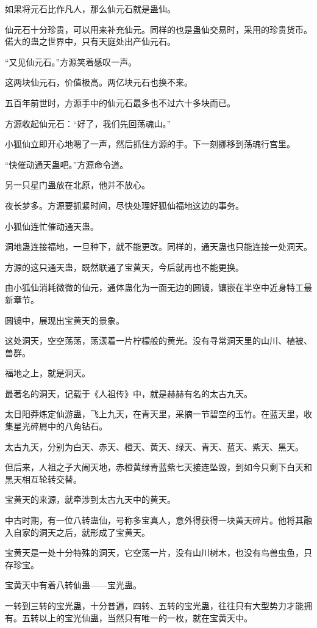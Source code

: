 \begin{this_body}
如果将元石比作凡人，那么仙元石就是蛊仙。

仙元石十分珍贵，可以用来补充仙元。同样的也是蛊仙交易时，采用的珍贵货币。偌大的蛊之世界中，只有天庭处出产仙元石。

“又见仙元石。”方源笑着感叹一声。

这两块仙元石，价值极高。两亿块元石也换不来。

五百年前世时，方源手中的仙元石最多也不过六十多块而已。

方源收起仙元石：“好了，我们先回荡魂山。”

小狐仙立即开心地嗯了一声，然后抓住方源的手。下一刻挪移到荡魂行宫里。

“快催动通天蛊吧。”方源命令道。

另一只星门蛊放在北原，他并不放心。

夜长梦多。方源要抓紧时间，尽快处理好狐仙福地这边的事务。

小狐仙连忙催动通天蛊。

洞地蛊连接福地，一旦种下，就不能更改。同样的，通天蛊也只能连接一处洞天。

方源的这只通天蛊，既然联通了宝黄天，今后就再也不能更换。

由小狐仙消耗微微的仙元，通体蛊化为一面无边的圆镜，镶嵌在半空中近身特工最新章节。

圆镜中，展现出宝黄天的景象。

这处洞天，空空荡荡，荡漾着一片柠檬般的黄光。没有寻常洞天里的山川、植被、兽群。

福地之上，就是洞天。

最著名的洞天，记载于《人祖传》中，就是赫赫有名的太古九天。

太日阳莽炼定仙游蛊，飞上九天，在青天里，采摘一节碧空的玉竹。在蓝天里，收集星光碎屑中的八角钻石。

太古九天，分别为白天、赤天、橙天、黄天、绿天、青天、蓝天、紫天、黑天。

但后来，人祖之子大闹天地，赤橙黄绿青蓝紫七天接连坠毁，到如今只剩下白天和黑天相互轮转交替。

宝黄天的来源，就牵涉到太古九天中的黄天。

中古时期，有一位八转蛊仙，号称多宝真人，意外得获得一块黄天碎片。他将其融入自家的洞天之后，就形成了宝黄天。

宝黄天是一处十分特殊的洞天，它空荡一片，没有山川树木，也没有鸟兽虫鱼，只存珍宝。

宝黄天中有着八转仙蛊——宝光蛊。

一转到三转的宝光蛊，十分普遍，四转、五转的宝光蛊，往往只有大型势力才能拥有。五转以上的宝光仙蛊，当然只有唯一的一枚，就在宝黄天中。


\end{this_body}
